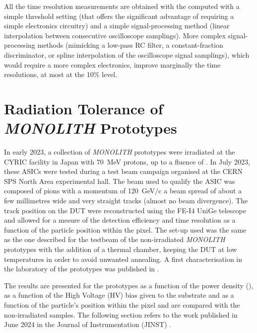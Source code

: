 		All the time resolution measurements are obtained with the \toa computed with a simple threshold setting (that offers the significant advantage of requiring a simple electronics circuitry) and a simple signal-processing method (linear interpolation between consecutive oscilloscope samplings).
		More complex signal-processing methods (mimicking a low-pass RC filter, a constant-fraction discriminator, or spline interpolation of the oscilloscope signal samplings), which would require a more complex electronics, improve marginally the time resolutions, at most at the 10\% level.















	\clearpage
	\section{Radiation Tolerance of \textit{MONOLITH} Prototypes}
	In early 2023, a collection of \textit{MONOLITH} prototypes were irradiated at the CYRIC facility \cite{CYRIC_facility} in Japan with \SI{70}{\mega\electronvolt} protons, up to a fluence of \maxflu. In July 2023, these ASICs were tested during a test beam campaign organised at the CERN SPS North Area experimental hall. The beam used to qualify the ASIC was composed of pions with a momentum of \SI{120}{\giga\electronvolt}/c a beam spread of about a few millimetres wide and very straight tracks (almost no beam divergence). The track position on the DUT were reconstructed using the FE-I4 UniGe telescope \cite{telescope} and allowed for a mesure of the detection efficiency and time resolution as a function of the particle position within the pixel. The set-up used was the same as the one described for the testbeam of the non-irradiated \textit{MONOLITH} prototypes with the addition of a thermal chamber, keeping the DUT at low temperatures in order to avoid unwanted annealing. A first characterisation in the laboratory of the prototypes was published in \cite{LabRad_Mono2023}.
		
	The results are presented for the prototypes as a function of the power density (\power), as a function of the High Voltage (HV) bias given to the substrate and as a function of the particle's position within the pixel and are compared with the non-irradiated samples. The following section refers to the work published in June 2024 in the Journal of Instrumentation (JINST) \cite{Moretti_irradiated}.

